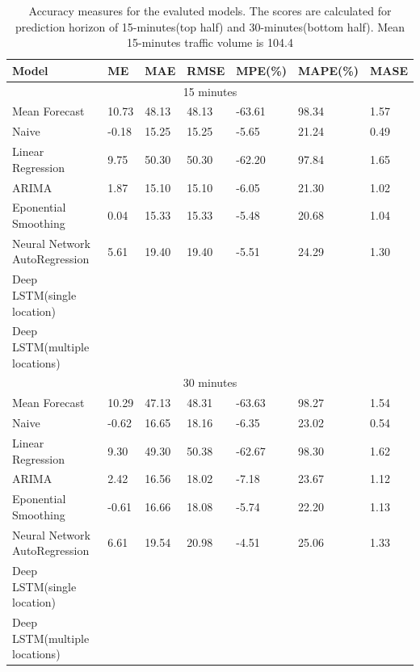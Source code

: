 \begin{table}
\centering
    \begin{tabular}{| l | l | l| l | l | l | l|} \hline
        \textbf{Model}  & \textbf{ME} & \textbf{MAE} & \textbf{RMSE} & \textbf{MPE(\%)} & \textbf{MAPE(\%)} & \textbf{MASE} \\ \hline
        \multicolumn{7}{|c|}{15 minutes} \\ \hline
        Mean Forecast                    & 10.73 & 48.13 & 48.13 & -63.61 & 98.34 & 1.57 \\ \hline
        Naive                            & -0.18 & 15.25 & 15.25 & -5.65 & 21.24 & 0.49 \\ \hline
        Linear Regression                & 9.75 & 50.30 & 50.30 & -62.20 & 97.84 & 1.65 \\ \hline
        ARIMA                            & 1.87 & 15.10 & 15.10 & -6.05 & 21.30 & 1.02 \\ \hline
        Eponential Smoothing             & 0.04 & 15.33 & 15.33 & -5.48 & 20.68 & 1.04 \\ \hline
        Neural Network AutoRegression    & 5.61 & 19.40 & 19.40 & -5.51 & 24.29 & 1.30 \\ \hline
        Deep LSTM(single location)       &  &  &  &  &  &  \\ \hline
        Deep LSTM(multiple locations)    &  &  &  &  &  &  \\ \hline
        \multicolumn{7}{|c|}{30 minutes} \\ \hline
        Mean Forecast                    & 10.29 & 47.13 & 48.31 & -63.63 & 98.27 & 1.54 \\ \hline
        Naive                            & -0.62 & 16.65 & 18.16 & -6.35 & 23.02 & 0.54 \\ \hline
        Linear Regression                & 9.30 & 49.30 & 50.38 & -62.67 & 98.30 & 1.62 \\ \hline
        ARIMA                            & 2.42 & 16.56 & 18.02 & -7.18 & 23.67 & 1.12 \\ \hline
        Eponential Smoothing             & -0.61 & 16.66 & 18.08 & -5.74 & 22.20 & 1.13 \\ \hline
        Neural Network AutoRegression    & 6.61 & 19.54 & 20.98 & -4.51 & 25.06 & 1.33 \\ \hline
        Deep LSTM(single location)       &  &  &  &  &  &  \\ \hline
        Deep LSTM(multiple locations)    &  &  &  &  &  &  \\ \hline
    \end{tabular}
    \caption[Model comparisons]{Accuracy measures for the evaluted models. The scores are
    calculated for prediction horizon of 15-minutes(top half) and 30-minutes(bottom half). Mean
    15-minutes traffic volume is 104.4}
    \label{table:accuracyScores}
\end{table}
